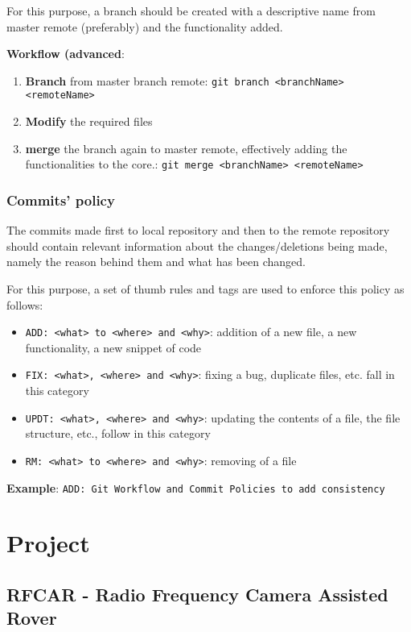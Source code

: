 \documentclass[11pt]{article}
\begin{document}
\begin{enumerate}
For this purpose, a branch should be created with a descriptive name from master
remote (preferably) and the functionality added.

\textbf{Workflow (advanced}:
\begin{enumerate}
\item \textbf{Branch} from master branch remote: \texttt{git branch <branchName> <remoteName>}
\item \textbf{Modify} the required files
\item \textbf{merge} the branch again to master remote, effectively adding the
functionalities to the core.: \texttt{git merge <branchName> <remoteName>}
\end{enumerate}
\end{enumerate}

\subsubsection{Commits' policy}
\label{sec:orgdeaac38}
The commits made first to local repository and then to the remote repository
should contain relevant information about the changes/deletions being made,
namely the reason behind them and what has been changed.

For this purpose, a set of thumb rules and tags are used to enforce this policy
as follows:
\begin{itemize}
\item \texttt{ADD: <what> to <where> and <why>}: addition of a new file, a new
functionality, a new snippet of code
\item \texttt{FIX: <what>, <where> and <why>}: fixing a bug, duplicate files, etc. fall in
this category
\item \texttt{UPDT: <what>, <where> and <why>}: updating the contents of a file, the file
structure, etc., follow in this category
\item \texttt{RM: <what> to <where> and <why>}: removing of a file
\end{itemize}

\textbf{Example}: \texttt{ADD: Git Workflow and Commit Policies to add consistency}
\section{Project}
\label{sec:org6085193}
\subsection{RFCAR - Radio Frequency Camera Assisted Rover}
\label{sec:org6b47175}
\end{document}

